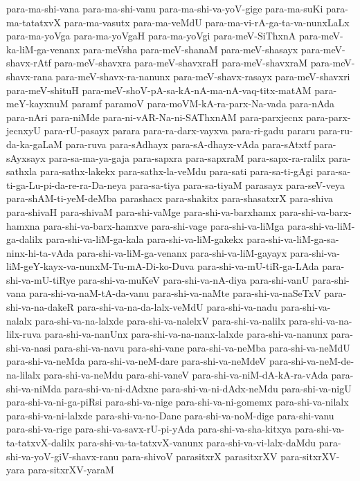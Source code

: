 {para-ma-shi-vana
para-ma-shi-vanu
para-ma-shi-va-yoV-gige
para-ma-suKi
para-ma-tatatxvX
para-ma-vasutx
para-ma-veMdU
para-ma-vi-rA-ga-ta-va-nunxLaLx
para-ma-yoVga
para-ma-yoVgaH
para-ma-yoVgi
para-meV-SiThxnA
para-meV-ka-liM-ga-venanx
para-meVsha
para-meV-shanaM
para-meV-shasayx
para-meV-shavx-rAtf
para-meV-shavxra
para-meV-shavxraH
para-meV-shavxraM
para-meV-shavx-rana
para-meV-shavx-ra-nanunx
para-meV-shavx-rasayx
para-meV-shavxri
para-meV-shituH
para-meV-shoV-pA-sa-kA-nA-ma-nA-vaq-titx-matAM
para-meY-kayxnuM
paramf
paramoV
para-moVM-kA-ra-parx-Na-vada
para-nAda
para-nAri
para-niMde
para-ni-vAR-Na-ni-SAThxnAM
para-parxjecnx
para-parx-jecnxyU
para-rU-pasayx
parara
para-ra-darx-vayxva
para-ri-gadu
pararu
para-ru-da-ka-gaLaM
para-ruva
para-sAdhayx
para-sA-dhayx-vAda
para-sAtxtf
para-sAyxsayx
para-sa-ma-ya-gaja
para-sapxra
para-sapxraM
para-sapx-ra-ralilx
para-sathxla
para-sathx-lakekx
para-sathx-la-veMdu
para-sati
para-sa-ti-gAgi
para-sa-ti-ga-Lu-pi-da-re-ra-Da-neya
para-sa-tiya
para-sa-tiyaM
parasayx
para-seV-veya
para-shAM-ti-yeM-deMba
parashacx
para-shakitx
para-shasatxrX
para-shiva
para-shivaH
para-shivaM
para-shi-vaMge
para-shi-va-barxhamx
para-shi-va-barx-hamxna
para-shi-va-barx-hamxve
para-shi-vage
para-shi-va-liMga
para-shi-va-liM-ga-dalilx
para-shi-va-liM-ga-kala
para-shi-va-liM-gakekx
para-shi-va-liM-ga-sa-ninx-hi-ta-vAda
para-shi-va-liM-ga-venanx
para-shi-va-liM-gayayx
para-shi-va-liM-geY-kayx-va-nunxM-Tu-mA-Di-ko-Duva
para-shi-va-mU-tiR-ga-LAda
para-shi-va-mU-tiRye
para-shi-va-muKeV
para-shi-va-nA-diya
para-shi-vanU
para-shi-vana
para-shi-va-naM-tA-da-vanu
para-shi-va-naMte
para-shi-va-naSeTxV
para-shi-va-na-dakeR
para-shi-va-na-da-lalx-veMdU
para-shi-va-nadu
para-shi-va-nalalx
para-shi-va-na-lalxde
para-shi-va-nalelxV
para-shi-va-nalilx
para-shi-va-na-lilx-ruva
para-shi-va-nanUnx
para-shi-va-na-nanx-lalxde
para-shi-va-nanunx
para-shi-va-nasi
para-shi-va-navu
para-shi-vane
para-shi-va-neMba
para-shi-va-neMdU
para-shi-va-neMda
para-shi-va-neM-dare
para-shi-va-neMdeV
para-shi-va-neM-de-na-lilalx
para-shi-va-neMdu
para-shi-vaneV
para-shi-va-niM-dA-kA-ra-vAda
para-shi-va-niMda
para-shi-va-ni-dAdxne
para-shi-va-ni-dAdx-neMdu
para-shi-va-nigU
para-shi-va-ni-ga-piRsi
para-shi-va-nige
para-shi-va-ni-gomemx
para-shi-va-nilalx
para-shi-va-ni-lalxde
para-shi-va-no-Dane
para-shi-va-noM-dige
para-shi-vanu
para-shi-va-rige
para-shi-va-savx-rU-pi-yAda
para-shi-va-sha-kitxya
para-shi-va-ta-tatxvX-dalilx
para-shi-va-ta-tatxvX-vanunx
para-shi-va-vi-lalx-daMdu
para-shi-va-yoV-giV-shavx-ranu
para-shivoV
parasitxrX
parasitxrXV
para-sitxrXV-yara
para-sitxrXV-yaraM
}
